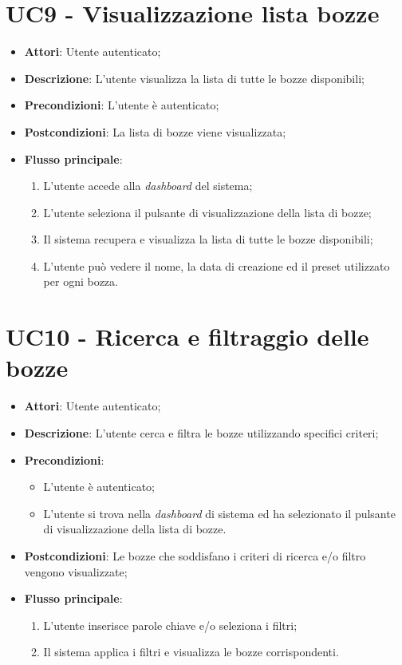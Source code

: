 \vspace{0.5cm}  
\section*{UC9 - Visualizzazione lista bozze}
\begin{itemize}
    \item \textbf{Attori}: Utente autenticato;
    \item \textbf{Descrizione}: L'utente visualizza la lista di tutte le bozze disponibili;
    \item \textbf{Precondizioni}: L'utente è autenticato;
    \item \textbf{Postcondizioni}: La lista di bozze viene visualizzata;
    \item \textbf{Flusso principale}:
    \begin{enumerate}
        \item L'utente accede alla \textit{dashboard} del sistema;
        \item L'utente seleziona il pulsante di visualizzazione della lista di bozze;
        \item Il sistema recupera e visualizza la lista di tutte le bozze disponibili;
        \item L'utente può vedere il nome, la data di creazione ed il preset utilizzato per ogni bozza.
    \end{enumerate}
\end{itemize}

\vspace{0.5cm}  
\section*{UC10 - Ricerca e filtraggio delle bozze}
\begin{itemize}
    \item \textbf{Attori}: Utente autenticato;
    \item \textbf{Descrizione}: L'utente cerca e filtra le bozze utilizzando specifici criteri;
    \item \textbf{Precondizioni}: 
    \begin{itemize}
        \item L'utente è autenticato;
        \item L'utente si trova nella \textit{dashboard} di sistema ed ha selezionato il pulsante di visualizzazione della lista di bozze.
    \end{itemize}
    \item \textbf{Postcondizioni}: Le bozze che soddisfano i criteri di ricerca e/o filtro vengono visualizzate;
    \item \textbf{Flusso principale}:
    \begin{enumerate}
        \item L'utente inserisce parole chiave e/o seleziona i filtri;
        \item Il sistema applica i filtri e visualizza le bozze corrispondenti.
    \end{enumerate}
\end{itemize}


